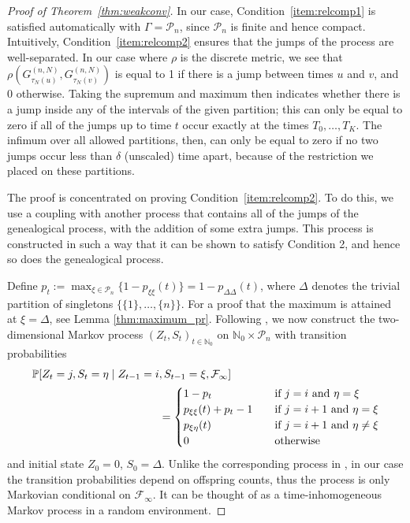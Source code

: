 \begin{proof}[Proof of Theorem~\ref{thm:weakconv}]
In our case, Condition~\ref{item:relcomp1} is satisfied automatically with $\Gamma = \mathcal{P}_n$, since $\mathcal{P}_n$ is finite and hence compact. 
Intuitively, Condition~\ref{item:relcomp2} ensures that the jumps of the process are well-separated. 
In our case where $\rho$ is the discrete metric, we see that $\rho( G_{\tau_N(u)}^{(n,N)}, G_{\tau_N(v)}^{(n,N)} )$ is equal to 1 if there is a jump between times $u$ and $v$, and 0 otherwise.
Taking the supremum and maximum then indicates whether there is a jump inside any of the intervals of the given partition; this can only be equal to zero if all of the jumps up to time $t$ occur exactly at the times $T_0, \dots, T_K$. 
The infimum over all allowed partitions, then, can only be equal to zero if no two jumps occur less than $\delta$ (unscaled) time apart, because of the restriction we placed on these partitions.

The proof is concentrated on proving Condition~\ref{item:relcomp2}.
To do this, we use a coupling with another process that contains all of the jumps of the genealogical process, with the addition of some extra jumps. This process is constructed in such a way that it can be shown to satisfy Condition 2, and hence so does the genealogical process.

Define $p_t := \max_{\xi\in \mathcal{P}_n} \{1 - p_{\xi\xi}(t)\} = 1 - p_{\Delta\Delta}(t)$, where $\Delta$ denotes the trivial partition of singletons $\{ \{1\},\dots, \{n\} \}$. For a proof that the maximum is attained at $\xi = \Delta$, see Lemma \ref{thm:maximum_pr}. 
Following \textcite{mohle1999}, we now construct the two-dimensional Markov process $(Z_t, S_t)_{t \in \mathbb{N}_0}$ on $\mathbb{N}_0 \times \mathcal{P}_n$ with transition probabilities
\begin{align}
\mathbb{P}[ Z_t = j , S_t = \eta \mid Z_{t-1} = i&, S_{t-1} = \xi, \mathcal{F}_\infty] \notag\\
&= \begin{cases}
1 - p_t &\quad \text{if } j=i \text{ and } \eta=\xi \\
p_{\xi\xi}(t) + p_t - 1  &\quad \text{if } j=i+1 \text{ and } \eta=\xi \\
p_{\xi\eta}(t) &\quad \text{if } j=i+1 \text{ and } \eta\neq\xi \\
0 &\quad \text{otherwise} 
\end{cases}
\label{eq:constructed_chain}
\end{align}
and initial state $Z_0=0$, $S_0 = \Delta$.
Unlike the corresponding process in \textcite{mohle1999}, in our case the transition probabilities depend on offspring counts, thus the process is only Markovian conditional on $\mathcal{F}_\infty$. It can be thought of as a time-inhomogeneous Markov process in a random environment.


\end{proof}
